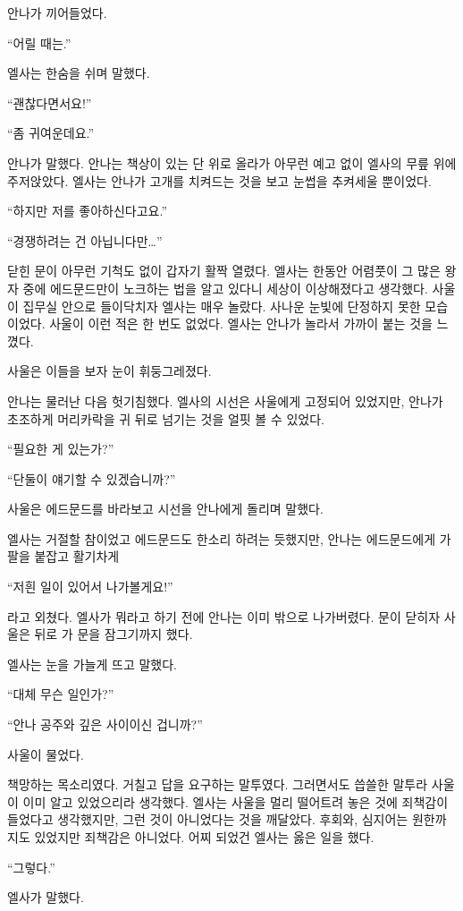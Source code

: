 안나가 끼어들었다.

``어릴 때는.''

엘사는 한숨을 쉬며 말했다.

``괜찮다면서요!''

``좀 귀여운데요.''

안나가 말했다. 안나는 책상이 있는 단 위로 올라가 아무런 예고 없이 엘사의 무릎 위에 주저앉았다. 엘사는 안나가 고개를 치켜드는 것을 보고 눈썹을 추켜세울 뿐이었다.

``하지만 저를 좋아하신다고요.''

``경쟁하려는 건 아닙니다만\ldots''

닫힌 문이 아무런 기척도 없이 갑자기 활짝 열렸다. 엘사는 한동안 어렴풋이 그 많은 왕자 중에 에드문드만이 노크하는 법을 알고 있다니 세상이 이상해졌다고 생각했다. 사울이 집무실 안으로 들이닥치자 엘사는 매우 놀랐다. 사나운 눈빛에 단정하지 못한 모습이었다. 사울이 이런 적은 한 번도 없었다. 엘사는 안나가 놀라서 가까이 붙는 것을 느꼈다.

사울은 이들을 보자 눈이 휘둥그레졌다.

안나는 물러난 다음 헛기침했다. 엘사의 시선은 사울에게 고정되어 있었지만, 안나가 초조하게 머리카락을 귀 뒤로 넘기는 것을 얼핏 볼 수 있었다.

``필요한 게 있는가?''

``단둘이 얘기할 수 있겠습니까?''

사울은 에드문드를 바라보고 시선을 안나에게 돌리며 말했다.

엘사는 거절할 참이었고 에드문드도 한소리 하려는 듯했지만, 안나는 에드문드에게 가 팔을 붙잡고 활기차게

``저흰 일이 있어서 나가볼게요!''

라고 외쳤다. 엘사가 뭐라고 하기 전에 안나는 이미 밖으로 나가버렸다. 문이 닫히자 사울은 뒤로 가 문을 잠그기까지 했다.

엘사는 눈을 가늘게 뜨고 말했다.

``대체 무슨 일인가?''

``안나 공주와 깊은 사이이신 겁니까?''

사울이 물었다.

책망하는 목소리였다. 거칠고 답을 요구하는 말투였다. 그러면서도 씁쓸한 말투라 사울이 이미 알고 있었으리라 생각했다. 엘사는 사울을 멀리 떨어트려 놓은 것에 죄책감이 들었다고 생각했지만, 그런 것이 아니었다는 것을 깨달았다. 후회와, 심지어는 원한까지도 있었지만 죄책감은 아니었다. 어찌 되었건 엘사는 옳은 일을 했다.

``그렇다.''

엘사가 말했다.

